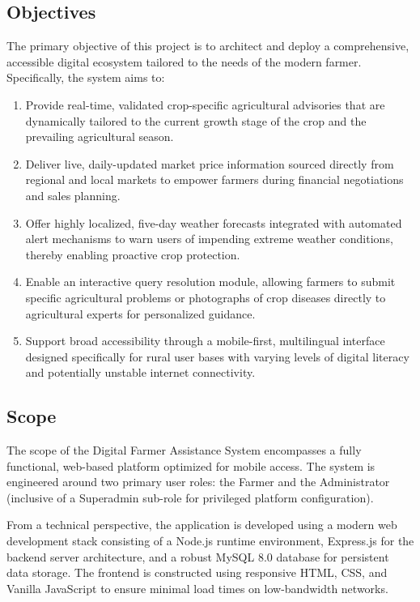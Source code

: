 \subsection{Objectives}
The primary objective of this project is to architect and deploy a comprehensive, accessible digital ecosystem tailored to the needs of the modern farmer. Specifically, the system aims to:
\begin{enumerate}
    \item Provide real-time, validated crop-specific agricultural advisories that are dynamically tailored to the current growth stage of the crop and the prevailing agricultural season.
    \item Deliver live, daily-updated market price information sourced directly from regional and local markets to empower farmers during financial negotiations and sales planning.
    \item Offer highly localized, five-day weather forecasts integrated with automated alert mechanisms to warn users of impending extreme weather conditions, thereby enabling proactive crop protection.
    \item Enable an interactive query resolution module, allowing farmers to submit specific agricultural problems or photographs of crop diseases directly to agricultural experts for personalized guidance.
    \item Support broad accessibility through a mobile-first, multilingual interface designed specifically for rural user bases with varying levels of digital literacy and potentially unstable internet connectivity.
\end{enumerate}

\subsection{Scope}
The scope of the Digital Farmer Assistance System encompasses a fully functional, web-based platform optimized for mobile access. The system is engineered around two primary user roles: the Farmer and the Administrator (inclusive of a Superadmin sub-role for privileged platform configuration). 

From a technical perspective, the application is developed using a modern web development stack consisting of a Node.js runtime environment, Express.js for the backend server architecture, and a robust MySQL 8.0 database for persistent data storage. The frontend is constructed using responsive HTML, CSS, and Vanilla JavaScript to ensure minimal load times on low-bandwidth networks. 

